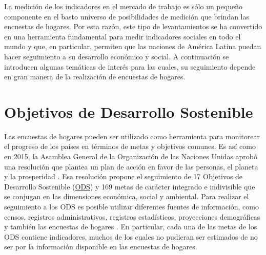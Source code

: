 \documentclass[
  12pt,
  spanish,
]{book}
\begin{document}
La medición de los indicadores en el mercado de trabajo es sólo un pequeño componente en el basto universo de posibilidades de medición que brindan las encuestas de hogares. Por esta razón, este tipo de levantamientos se ha convertido en una herramienta fundamental para medir indicadores sociales en todo el mundo y que, en particular, permiten que las naciones de América Latina puedan hacer seguimiento a su desarrollo económico y social. A continuación se introducen algunas temáticas de interés para las cuales, su seguimiento depende en gran manera de la realización de encuestas de hogares.

\hypertarget{objetivos-de-desarrollo-sostenible}{%
\section{Objetivos de Desarrollo Sostenible}\label{objetivos-de-desarrollo-sostenible}}

Las encuestas de hogares pueden ser utilizado como herramienta para monitorear el progreso de los países en términos de metas y objetivos comunes. Es así como en 2015, la Asamblea General de la Organización de las Naciones Unidas aprobó una resolución que plantea un plan de acción en favor de las personas, el planeta y la prosperidad \citep{United_Nations_2015}. Esa resolución propone el seguimiento de 17 Objetivos de Desarrollo Sostenible (\href{https://sustainabledevelopment.un.org}{ODS}) y 169 metas de carácter integrado e indivisible que se conjugan en las dimensiones económica, social y ambiental. Para realizar el seguimiento a los ODS es posible utilizar diferentes fuentes de información, como censos, registros administrativos, registros estadísticos, proyecciones demográficas y también las encuestas de hogares \citep{United_Nations_2016}. En particular, cada una de las metas de los ODS contiene indicadores, muchos de los cuales no pudieran ser estimados de no ser por la información disponible en las encuestas de hogares.
\end{document}
